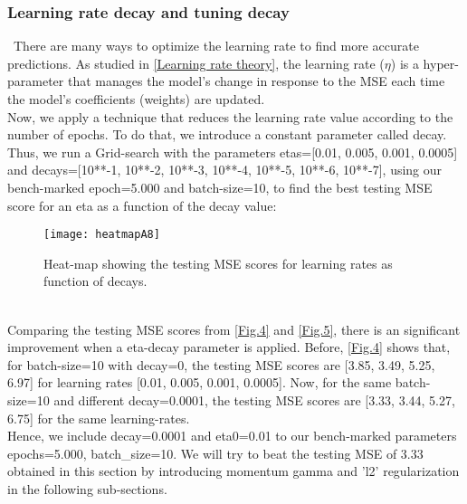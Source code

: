 \subsubsection{Learning rate decay and tuning decay}
\label{chap:Learning rate decay and tuning decay}

\qquad \, There are many ways to optimize the learning rate to find more accurate predictions. As studied in \hyperref[chap:Learning Rate]{[Learning rate theory]}, the learning rate ($\eta$) is a hyper-parameter that manages the model's change in response to the MSE each time the model's coefficients (weights) are updated.\\

Now, we apply a technique that reduces the learning rate value according to the number of epochs. To do that, we introduce a constant parameter called decay.\\

Thus, we run a Grid-search with the parameters etas=[0.01, 0.005, 0.001, 0.0005] and decays=[10**-1, 10**-2, 10**-3, 10**-4, 10**-5, 10**-6, 10**-7], using our bench-marked epoch=5.000 and batch-size=10, to find the best testing MSE score for an eta as a function of the decay value:\\

\begin{figure}[H]
\label{fig:figA5}
\centering
\texttt{[image: heatmapA8]}
\caption{Heat-map showing the testing MSE scores for learning rates as function of decays.}
\end{figure}\\

Comparing the testing MSE scores from \hyperref[fig:figA4]{[Fig.4]} and \hyperref[fig:figA5]{[Fig.5]}, there is an significant improvement when a eta-decay parameter is applied. Before, \hyperref[fig:figA4]{[Fig.4]} shows that, for batch-size=10 with decay=0, the testing MSE scores are [3.85, 3.49, 5.25, 6.97] for learning rates [0.01, 0.005, 0.001, 0.0005]. Now, for the same batch-size=10 and different decay=0.0001, the testing MSE scores are [3.33, 3.44, 5.27, 6.75] for the same learning-rates.\\

Hence, we include decay=0.0001 and eta0=0.01 to our bench-marked parameters epochs=5.000, batch\_size=10. We will try to beat the testing MSE of 3.33 obtained in this section by introducing momentum gamma and 'l2' regularization in the following sub-sections.\\


